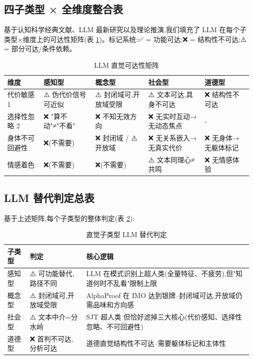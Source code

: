 \documentclass[11pt,a4paper]{article}
\begin{document}
\subsection{四子类型 × 全维度整合表}

基于认知科学经典文献、LLM 最新研究以及理论推演,我们填充了 LLM 在每个子类型×维度上的可达性矩阵(表 \ref{tab:matrix})。标记系统:✅ = 功能可达;❌ = 结构性不可达;⚠️ = 部分可达/条件依赖。

\begin{table}[htbp]
  \centering
  \caption{LLM 直觉可达性矩阵}
  \label{tab:matrix}
  \begin{tabular}{p{3cm}p{2.5cm}p{2.5cm}p{2.5cm}p{2.5cm}}
    \toprule
    \textbf{维度} & \textbf{感知型} & \textbf{概念型} & \textbf{社会型} & \textbf{道德型} \\
    \midrule
    代价敏感 1 & ⚠️ 伪代价信号可近似 & ⚠️ 封闭域可,开放域受限 & ⚠️ 文本可达,具身不可达 & ❌ 结构性不可达 \\
    \hline
    选择性忽略 2 & ❌ "算不动"≠"不看" & ❌ 不知无效方向 & ❌ 无实时互动→无动态焦点 & - \\
    \hline
    身体不可回避性 & ❌(不需要) & ❌ 封闭域 / ⚠️ 开放域 & ❌ 无关系嵌入→无真实代价 & ❌ 无身体→无躯体标记 \\
    \hline
    情感着色 & ❌(不需要) & ❌(不需要) & ⚠️ 文本同理心≠共鸣 & ❌ 无情感体验 \\
    \bottomrule
  \end{tabular}
\end{table}

\subsection{LLM 替代判定总表}

基于上述矩阵,每个子类型的整体判定(表 \ref{tab:verdict}):

\begin{table}[htbp]
  \centering
  \caption{直觉子类型 LLM 替代判定}
  \label{tab:verdict}
  \begin{tabular}{p{2cm}p{3cm}p{7cm}}
    \toprule
    \textbf{子类型} & \textbf{判定} & \textbf{核心逻辑} \\
    \midrule
    感知型 & ⚠️ 可功能替代,路径不同 & LLM 在模式识别上超人类(全量特征、不疲劳),但"知道何时不乱看"限制上限 \\
    \hline
    概念型 & ⚠️ 封闭域可,开放域受限 & AlphaProof 在 IMO 达到银牌\cite{alphaproof2024}--封闭域可达,开放域仍需品味和方向感 \\
    \hline
    社会型 & ⚠️ 文本中介=分水岭 & SJT 超人类\cite{sjt2024} 但恰好滤掉三大核心(代价感知、选择性忽略、不可回避性) \\
    \hline
    道德型 & ❌ 首判不可达,分析可达 & 道德直觉结构性不可达--需要躯体标记和主体性 \\
    \bottomrule
  \end{tabular}
\end{table}
\end{document}
